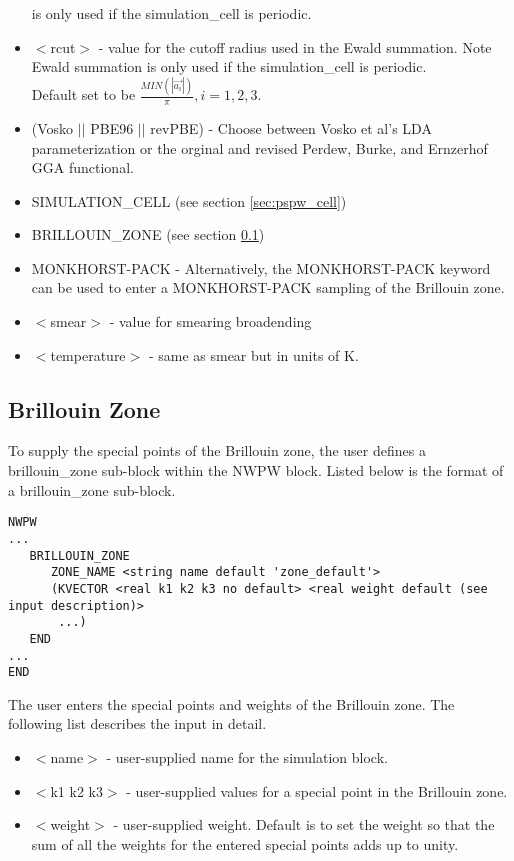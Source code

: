 \begin{itemize}
                          is only used if the simulation\_cell is periodic.
        \item $<$rcut$>$ - value for the cutoff radius used
                          in the Ewald summation. Note Ewald summation
                          is only used if the simulation\_cell is periodic. \\
                           Default set to be
                          $\frac{MIN(\left| \vec{a_i} \right|)}{\pi}, i=1,2,3$.
        \item (Vosko $||$ PBE96 $||$ revPBE) - Choose between Vosko et al's LDA 
                               parameterization or the orginal and revised Perdew, Burke, 
                               and Ernzerhof GGA functional.
        \item SIMULATION\_CELL (see section \ref{sec:pspw_cell})
        \item BRILLOUIN\_ZONE  (see section \ref{sec:band_brillouin_zone})
        \item MONKHORST-PACK - Alternatively, the MONKHORST-PACK keyword can be used 
                               to enter a MONKHORST-PACK sampling of the Brillouin zone.
        \item $<$smear$>$ - value for smearing broadending
        \item $<$temperature$>$ - same as smear but in units of K.

\end{itemize}


\subsection{Brillouin Zone}
\label{sec:band_brillouin_zone}
To supply the special points of the Brillouin zone,
the user defines a brillouin\_zone sub-block within the NWPW 
block.  Listed below is the format of a brillouin\_zone sub-block.
\begin{verbatim}
NWPW
...
   BRILLOUIN_ZONE
      ZONE_NAME <string name default 'zone_default'>
      (KVECTOR <real k1 k2 k3 no default> <real weight default (see input description)>
       ...)
   END
...
END
\end{verbatim}
The user enters the special points and weights of the
Brillouin zone.  The following list describes the input in detail.
\begin{itemize}
        \item $<$name$>$ - user-supplied name for the simulation block. 
        \item $<$k1 k2 k3$>$ - user-supplied values for a special point in the
                               Brillouin zone.
        \item $<$weight$>$ - user-supplied weight.  Default is to set the weight
                         so that the sum of all the weights for the entered  
                         special points adds up to unity.
\end{itemize}


